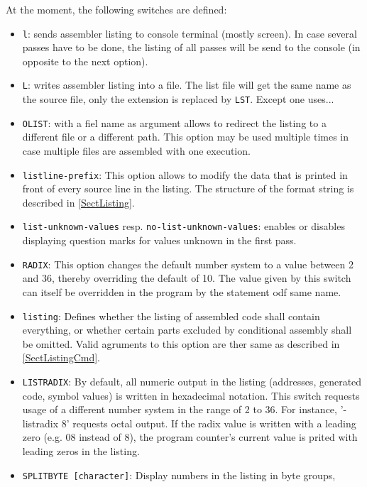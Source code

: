\documentclass[12pt,twoside]{report}
\makeatletter
\newcommand{\tty}[1]{{\tt #1}}
\newcommand{\ttindex}[1]{\index{#1@{\tt #1}}}
\makeatother
\begin{document}
At the moment, the following switches are defined:
\ttindex{SHARED}
\begin{itemize}
\item{\tty{l}: sends assembler listing to console terminal (mostly screen).
      In case several passes have to be done, the listing of all
      passes will be send to the console (in opposite to the next
      option).}
\item{\tty{L}: writes assembler listing into a file. The list file will get
      the same name as the source file, only the extension is
      replaced by \tty{LST}.  Except one uses... }
\item{\tty{OLIST}: with a fiel name as argument allows to redirect the
      listing to a different file or a different path.  This option may
      be used multiple times in case multiple files are assembled with
      one execution.}
\item{\tty{listline-prefix}: This option allows to modify the data that
      is printed in front of every source line in the listing.  The
      structure of the format string is described in \ref{SectListing}.}
\item{{\tt list-unknown-values} resp. {\tt no-list-unknown-values}: enables
      or disables displaying question marks for values unknown in the
      first pass.}
\item{\label{radix}\tty{RADIX}: This option changes the default number system
      to a value between 2 and 36, thereby overriding the default of 10.
      The value given by this switch can itself be overridden in the program
      by the statement odf same name.}
\item{\tty{listing}: Defines whether the listing of assembled code shall
      contain everything, or whether certain parts excluded by conditional 
      assembly shall be omitted.  Valid agruments to this option are ther same
      as described in \ref{SectListingCmd}.}
\item{\label{listradix}\tty{LISTRADIX}: By default, all numeric output in the listing
      (addresses, generated code, symbol values) is written in hexadecimal
      notation.  This switch requests usage of a different number system in the
      range of 2 to 36.  For instance, '-listradix 8' requests octal output.
      If the radix value is written with a leading zero (e.g. 08 instead of 8),
      the program counter's current value is prited with leading zeros in
      the listing.}
\item{\tty{SPLITBYTE [character]}: Display numbers in the listing in byte groups,
}
\end{itemize}
\end{document}
